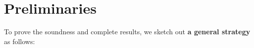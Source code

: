 


    





    

\section{Preliminaries}
\label{app:pre}

To prove the soundness and complete results, we sketch out \textbf{a general strategy} as follows:

